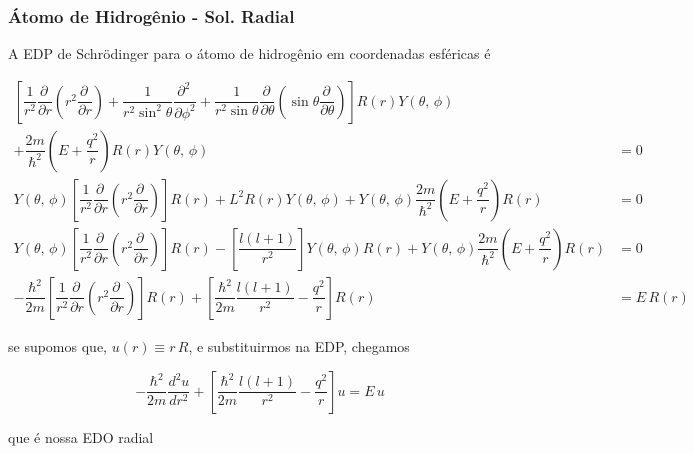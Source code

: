 \documentclass[12pt,brazil,table]{beamer}
\begin{document}
\begin{frame}
\begin{columns}[T]
\begin{center}
    \end{center}
    
  \end{columns}
   
\end{frame}





\begin{frame} 
  \frametitle{Átomo de Hidrogênio - Sol. Radial}
  \fontsize{8pt}{11pt}\selectfont
  
  A EDP de Schrödinger para o átomo de hidrogênio em coordenadas esféricas é
  
  \begin{align*}
    \left[ \dfrac{1}{r^2} \dfrac{\partial \,}{\partial r}\left(r^2\dfrac{\partial\,}{\partial r} \right) + \dfrac{1}{r^2\sin^2\theta}\dfrac{\partial^2 \,}{\partial \phi^2}+ \dfrac{1}{r^2\sin \theta }\dfrac{\partial \,}{\partial \theta}\left(\sin \theta\dfrac{\partial \,}{\partial \theta} \right) \right]R(r)Y(\theta,\,\phi)\qquad&\\
    + \dfrac{2m}{\hbar^2}\left( E + \dfrac{q^2}{r} \right)R(r)Y(\theta,\,\phi) &=0\\
    Y(\theta,\,\phi)\left[ \dfrac{1}{r^2} \dfrac{\partial \,}{\partial r}\left(r^2\dfrac{\partial\,}{\partial r} \right)\right]R(r) +  L^2 R(r)Y(\theta,\,\phi)+ Y(\theta,\,\phi)\dfrac{2m}{\hbar^2}\left( E + \dfrac{q^2}{r} \right)R(r) &= 0\\
    Y(\theta,\,\phi)\left[ \dfrac{1}{r^2} \dfrac{\partial \,}{\partial r}\left(r^2\dfrac{\partial\,}{\partial r} \right)\right]R(r) - \left[  \dfrac{l(l+1)}{r^2} \right]Y(\theta,\,\phi)R(r)+ Y(\theta,\,\phi)\dfrac{2m}{\hbar^2}\left( E + \dfrac{q^2}{r} \right)R(r) &= 0\\
            -\dfrac{\hbar^2}{2m}\left[\dfrac{1}{r^2} \dfrac{\partial \,}{\partial r}\left(r^2\dfrac{\partial\,}{\partial r} \right)\right]R(r) + \left[ \dfrac{\hbar^2}{2m} \dfrac{l(l+1)}{r^2} - \dfrac{q^2}{r} \right]R(r) &= E\,R(r)
  \end{align*}
  
  se supomos que, $u(r) \equiv r\,R$, e substituirmos na EDP, chegamos
  
  \[
   -\dfrac{\hbar^2}{2m}\dfrac{d^2u}{d r^2} + \left[ \dfrac{\hbar^2}{2m} \dfrac{l(l+1)}{r^2} - \dfrac{q^2}{r} \right]u = E\,u
  \]
  
  que é nossa EDO radial
  
\end{frame}
\end{document}
